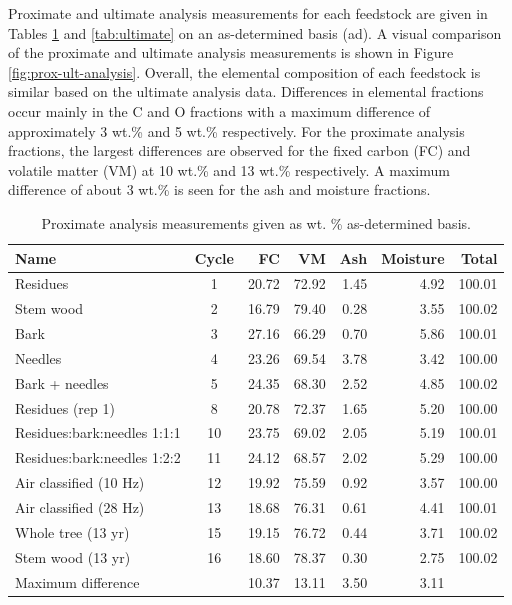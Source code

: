 \documentclass[12pt,titlepage]{article}
\begin{document}
Proximate and ultimate analysis measurements for each feedstock are given in Tables \ref{tab:proximate} and \ref{tab:ultimate} on an as-determined basis (ad). A visual comparison of the proximate and ultimate analysis measurements is shown in Figure \ref{fig:prox-ult-analysis}. Overall, the elemental composition of each feedstock is similar based on the ultimate analysis data. Differences in elemental fractions occur mainly in the C and O fractions with a maximum difference of approximately 3 wt.\% and 5 wt.\% respectively. For the proximate analysis fractions, the largest differences are observed for the fixed carbon (FC) and volatile matter (VM) at 10 wt.\% and 13 wt.\% respectively. A maximum difference of about 3 wt.\% is seen for the ash and moisture fractions.

\begin{table}[H]
    \caption{Proximate analysis measurements given as wt. \% as-determined basis.}
    \label{tab:proximate}
    \centering
    \begin{tabular}{lcrrrrr}
        \toprule
        Name & Cycle & FC & VM & Ash & Moisture & Total \\
        \midrule
        Residues                    & 1  & 20.72 & 72.92 & 1.45 & 4.92 & 100.01 \\
        Stem wood                   & 2  & 16.79 & 79.40 & 0.28 & 3.55 & 100.02 \\
        Bark                        & 3  & 27.16 & 66.29 & 0.70 & 5.86 & 100.01 \\
        Needles                     & 4  & 23.26 & 69.54 & 3.78 & 3.42 & 100.00 \\
        Bark + needles              & 5  & 24.35 & 68.30 & 2.52 & 4.85 & 100.02 \\
        Residues (rep 1)            & 8  & 20.78 & 72.37 & 1.65 & 5.20 & 100.00 \\
        Residues:bark:needles 1:1:1 & 10 & 23.75 & 69.02 & 2.05 & 5.19 & 100.01 \\
        Residues:bark:needles 1:2:2 & 11 & 24.12 & 68.57 & 2.02 & 5.29 & 100.00 \\
        Air classified (10 Hz)      & 12 & 19.92 & 75.59 & 0.92 & 3.57 & 100.00 \\
        Air classified (28 Hz)      & 13 & 18.68 & 76.31 & 0.61 & 4.41 & 100.01 \\
        Whole tree (13 yr)          & 15 & 19.15 & 76.72 & 0.44 & 3.71 & 100.02 \\
        Stem wood (13 yr)           & 16 & 18.60 & 78.37 & 0.30 & 2.75 & 100.02 \\
        \cmidrule{3-6}
        \multicolumn{2}{l}{Maximum difference} & 10.37 & 13.11 & 3.50 & 3.11 & \\
        \bottomrule
    \end{tabular}
\end{table}
\end{document}
